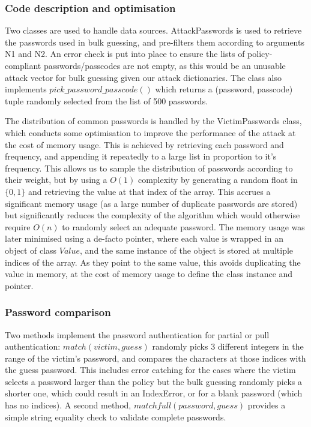 \documentclass[british,11pt,a4paper]{article}
\begin{document}
\subsubsection{Code description and optimisation}
Two classes are used to handle data sources. AttackPasswords is used to retrieve the passwords used in bulk guessing, and pre-filters them according to arguments N1 and N2. An error check is put into place to ensure the lists of policy-compliant passwords/passcodes are not empty, as this would be an unusable attack vector for bulk guessing given our attack dictionaries. The class also implements $pick\_password\_passcode()$ which returns a (password, passcode) tuple randomly selected from the list of 500 passwords.

The distribution of common passwords is handled by the VictimPasswords class, which conducts some optimisation to improve the performance of the attack at the cost of memory usage. This is achieved by retrieving each password and frequency, and appending it repeatedly to a large list in proportion to it's frequency. This allows us to sample the distribution of passwords according to their weight, but by using a $O(1)$ complexity by generating a random float in $\{0,1\}$ and retrieving the value at that index of the array. This accrues a significant memory usage (as a large number of duplicate passwords are stored) but significantly reduces the complexity of the algorithm which would otherwise require $O(n)$ to randomly select an adequate password. The memory usage was later minimised using a de-facto pointer, where each value is wrapped in an object of class $Value$, and the same instance of the object is stored at multiple indices of the array. As they point to the same value, this avoids duplicating the value in memory, at the cost of memory usage to define the class instance and pointer.

\subsubsection{Password comparison}
Two methods implement the password authentication for partial or pull authentication: $match(victim, guess)$ randomly picks 3 different integers in the range of the victim's password, and compares the characters at those indices with the guess password. This includes error catching for the cases where the victim selects a password larger than the policy but the bulk guessing randomly picks a shorter one, which could result in an IndexError, or for a blank password (which has no indices). A second method, $matchfull(password, guess)$ provides a simple string equality check to validate complete passwords.
 
\end{document}
